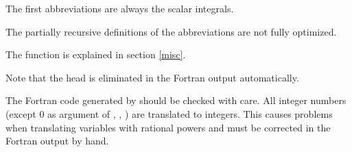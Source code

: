 {The first abbreviations are always the scalar integrals.

The partially recursive definitions of the 
abbreviations are not fully optimized. 

The function  is explained in section \ref{misc}.

Note that the head  is eliminated in the 
Fortran output automatically.
}
\enom
The Fortran code generated by  should be checked with care.
All integer numbers (except 0 as argument of , , ) 
are translated to integers. This causes problems when translating 
variables with rational powers and must be corrected in the Fortran 
output by hand.


